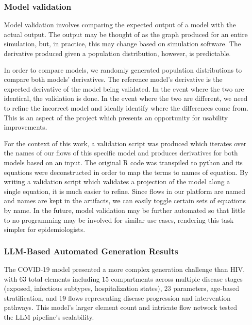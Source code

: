 \subsubsection{Model validation}

Model validation involves comparing the expected output of a model with the actual output. The output may be thought of as the graph produced for an entire simulation, but, in practice, this may change based on simulation software. The derivative produced given a population distribution, however, is predictable.

In order to compare models, we randomly generated population distributions to compare both models' derivatives. The reference model's derivative is the expected derivative of the model being validated. In the event where the two are identical, the validation is done. In the event where the two are different, we need to refine the incorrect model and ideally identify where the differences come from. This is an aspect of the project which presents an opportunity for usability improvements.

For the context of this work, a validation script was produced which iterates over the names of our flows of this specific model and produces derivatives for both models based on an input. The original R code was transpiled to python and its equations were deconstructed in order to map the terms to names of equation. By writing a validation script which validates a projection of the model along a single equation, it is much easier to refine. Since flows in our platform are named and names are kept in the artifacts, we can easily toggle certain sets of equations by name. In the future, model validation may be further automated so that little to no programming may be involved for similar use cases, rendering this task simpler for epidemiologists.

\subsubsection{LLM-Based Automated Generation Results}

The COVID-19 model presented a more complex generation challenge than HIV, with 63 total elements including 15 compartments across multiple disease stages (exposed, infectious subtypes, hospitalization states), 23 parameters, age-based stratification, and 19 flows representing disease progression and intervention pathways. This model's larger element count and intricate flow network tested the LLM pipeline's scalability.

